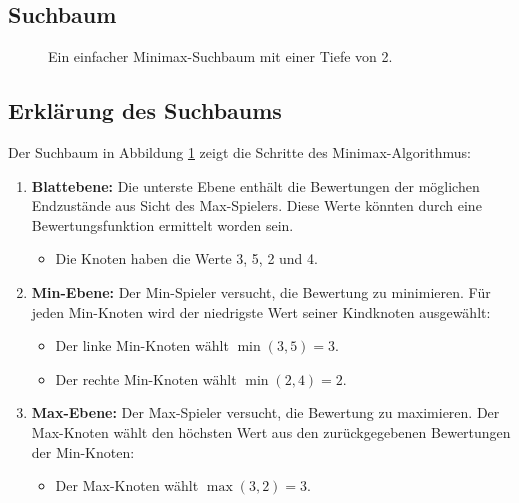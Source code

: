 \subsection*{Suchbaum}

\begin{figure}[h!]
	\centering
	\caption{Ein einfacher Minimax-Suchbaum mit einer Tiefe von 2.}
	\label{fig:minimax-example}
\end{figure}

\subsection*{Erklärung des Suchbaums}

Der Suchbaum in Abbildung \ref{fig:minimax-example} zeigt die Schritte des Minimax-Algorithmus:

\begin{enumerate}
	\item \textbf{Blattebene:} Die unterste Ebene enthält die Bewertungen der möglichen Endzustände aus Sicht des Max-Spielers. Diese Werte könnten durch eine Bewertungsfunktion ermittelt worden sein.
	\begin{itemize}
		\item Die Knoten haben die Werte 3, 5, 2 und 4.
	\end{itemize}
	
	\item \textbf{Min-Ebene:} Der Min-Spieler versucht, die Bewertung zu minimieren. Für jeden Min-Knoten wird der niedrigste Wert seiner Kindknoten ausgewählt:
	\begin{itemize}
		\item Der linke Min-Knoten wählt $\min(3, 5) = 3$.
		\item Der rechte Min-Knoten wählt $\min(2, 4) = 2$.
	\end{itemize}
	
	\item \textbf{Max-Ebene:} Der Max-Spieler versucht, die Bewertung zu maximieren. Der Max-Knoten wählt den höchsten Wert aus den zurückgegebenen Bewertungen der Min-Knoten:
	\begin{itemize}
		\item Der Max-Knoten wählt $\max(3, 2) = 3$.
	\end{itemize}
\end{enumerate}

